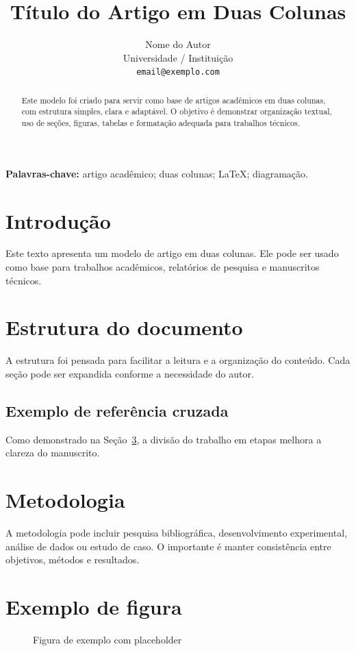 \documentclass[10pt,a4paper,twocolumn]{article}
\title{\textbf{Título do Artigo em Duas Colunas}}
\author{
Nome do Autor \\
\small Universidade / Instituição \\
\small \texttt{email@exemplo.com}
}
\date{}
\begin{document}
\maketitle

\begin{abstract}
Este modelo foi criado para servir como base de artigos acadêmicos em duas colunas, com estrutura simples, clara e adaptável. O objetivo é demonstrar organização textual, uso de seções, figuras, tabelas e formatação adequada para trabalhos técnicos.
\end{abstract}

\noindent\textbf{Palavras-chave:} artigo acadêmico; duas colunas; \LaTeX; diagramação.

\section{Introdução}
Este texto apresenta um modelo de artigo em duas colunas. Ele pode ser usado como base para trabalhos acadêmicos, relatórios de pesquisa e manuscritos técnicos.

\section{Estrutura do documento}
A estrutura foi pensada para facilitar a leitura e a organização do conteúdo. Cada seção pode ser expandida conforme a necessidade do autor.

\subsection{Exemplo de referência cruzada}
Como demonstrado na Seção~\ref{sec:metodologia}, a divisão do trabalho em etapas melhora a clareza do manuscrito.

\section{Metodologia}
\label{sec:metodologia}
A metodologia pode incluir pesquisa bibliográfica, desenvolvimento experimental, análise de dados ou estudo de caso. O importante é manter consistência entre objetivos, métodos e resultados.

\section{Exemplo de figura}
\begin{figure}[t]
    \centering
    \fbox{\rule{0pt}{3.5cm}\rule{0.9\linewidth}{0pt}}
    \caption{Figura de exemplo com placeholder}
    \label{fig:exemplo}
\end{figure}
\end{document}
